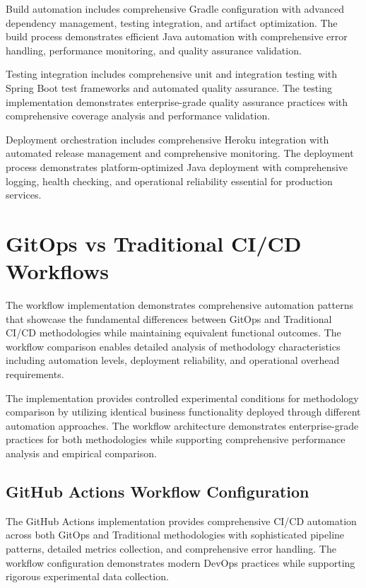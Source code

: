 Build automation includes comprehensive Gradle configuration with advanced dependency management, testing integration, and artifact optimization. The build process demonstrates efficient Java automation with comprehensive error handling, performance monitoring, and quality assurance validation.

Testing integration includes comprehensive unit and integration testing with Spring Boot test frameworks and automated quality assurance. The testing implementation demonstrates enterprise-grade quality assurance practices with comprehensive coverage analysis and performance validation.

Deployment orchestration includes comprehensive Heroku integration with automated release management and comprehensive monitoring. The deployment process demonstrates platform-optimized Java deployment with comprehensive logging, health checking, and operational reliability essential for production services.

\section{GitOps vs Traditional CI/CD Workflows}

The workflow implementation demonstrates comprehensive automation patterns that showcase the fundamental differences between GitOps and Traditional CI/CD methodologies while maintaining equivalent functional outcomes. The workflow comparison enables detailed analysis of methodology characteristics including automation levels, deployment reliability, and operational overhead requirements.

The implementation provides controlled experimental conditions for methodology comparison by utilizing identical business functionality deployed through different automation approaches. The workflow architecture demonstrates enterprise-grade practices for both methodologies while supporting comprehensive performance analysis and empirical comparison.

\subsection{GitHub Actions Workflow Configuration}

The GitHub Actions implementation provides comprehensive CI/CD automation across both GitOps and Traditional methodologies with sophisticated pipeline patterns, detailed metrics collection, and comprehensive error handling. The workflow configuration demonstrates modern DevOps practices while supporting rigorous experimental data collection.

